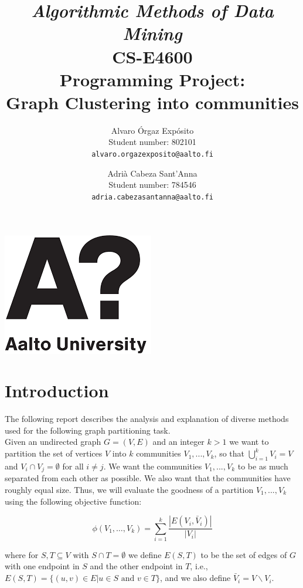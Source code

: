 \documentclass[11pt]{extarticle}
\title{\huge \emph{Algorithmic Methods of Data Mining} \\ CS-E4600 \vspace{1cm} \\ Programming Project: \\ Graph Clustering into communities \vspace{1cm}}
\author{
Alvaro Órgaz Expósito \\ Student number: 802101 \\ \texttt{alvaro.orgazexposito@aalto.fi}   
\and
Adrià Cabeza Sant'Anna \\ Student number: 784546 \\ \texttt{adria.cabezasantanna@aalto.fi} 
\vspace{1cm}
}
\begin{document}
\maketitle
\begin{center}
\vspace{\fill} \includegraphics[scale=0.3]{figures/AaltoLogo.png} \vspace{5cm}
\end{center}
\newpage
\tableofcontents
\newpage

\section{Introduction}

The following report describes the analysis and explanation of diverse methods used for the following graph partitioning task.\\

Given an undirected graph $G=(V,E)$ and an integer $k > 1$ we want to partition the set of vertices $V$ into $k$ communities $V_1,...,V_k$, so that $\bigcup_{i=1}^{k} V_i = V$ and $V_i \cap V_j = \emptyset$ for all $i \neq j$. We want the communities $V_1,...,V_k$ to be as much separated from each other as possible. We also want that the communities have roughly equal size. Thus, we will evaluate the goodness of a partition $V_1,...,V_k$ using the following objective function:

\begin{equation}
\phi\left(V_{1}, \ldots, V_{k}\right)=\sum_{i=1}^{k} \frac{\left|E\left(V_{i}, \bar{V}_{i}\right)\right|}{\left|V_{i}\right|}
\end{equation}

where for $S, T \subseteq V$ with $S \cap T = \emptyset$ we define $E(S,T)$ to be the set of edges of $G$ with one endpoint in $S$ and the other endpoint in $T$, i.e., $E(S, T)=\{(u, v) \in E | u \in S \text { and } v \in T\}$, and we also  define $\bar{V}_{i}=V \backslash V_{i}$.\\
\end{document}
